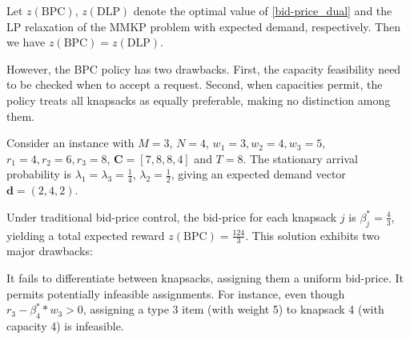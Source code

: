 



Let $z(\text{BPC})$, $z(\text{DLP})$ denote the optimal value of \eqref{bid-price_dual} and the LP relaxation of the \textup{MMKP} problem with expected demand, respectively. Then we have $z(\text{BPC}) = z(\text{DLP})$.

However, the BPC policy has two drawbacks. First, the capacity feasibility need to be checked when to accept a request. Second, when capacities permit, the policy treats all knapsacks as equally preferable, making no distinction among them.

\begin{example}
Consider an instance with $M =3$, $N =4$, $w_{1} = 3, w_{2} = 4, w_{3} = 5$, $r_{1} = 4, r_{2} = 6, r_{3} = 8$, $\bm{C} = [7, 8, 8, 4]$ and $T = 8$. The stationary arrival probability is $\lambda_{1} = \lambda_{3} = \frac{1}{4}$, $\lambda_{2} = \frac{1}{2}$, giving an expected demand vector $\bm{d} = (2, 4, 2)$.

Under traditional bid-price control, the bid-price for each knapsack $j$ is $\beta_{j}^{*} = \frac{4}{3}$, yielding a total expected reward $z(\text{BPC}) = \frac{124}{3}$. This solution exhibits two major drawbacks: 

It fails to differentiate between knapsacks, assigning them a uniform bid-price. It permits potentially infeasible assignments. For instance, even though $r_{3} - \beta_{4}^{*} * w_{3} > 0$, assigning a type 3 item (with weight 5) to knapsack 4 (with capacity 4) is infeasible.
\end{example}

